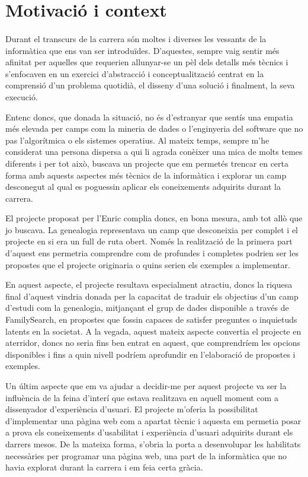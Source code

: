 \section{Motivació i context}

    \paragraph{}
    Durant el transcurs de la carrera són moltes i diverses les vessants de la informàtica que ens van ser introduïdes. D’aquestes, sempre vaig sentir més afinitat per aquelles que requerien allunyar-se un pèl dels detalls més tècnics i s'enfocaven en un exercici d’abstracció i conceptualització centrat en la comprensió d’un problema quotidià, el disseny d’una solució i finalment, la seva execució.

    Entenc doncs, que donada la situació, no és d'estranyar que sentís una empatia més elevada per camps com la mineria de dades o l’enginyeria del software que no pas l'algorítmica o els sistemes operatius. Al mateix temps, sempre m’he considerat una persona dispersa a qui li agrada conèixer una mica de molts temes diferents i per tot això, buscava un projecte que em permetés trencar en certa forma amb aquests aspectes més tècnics de la informàtica i explorar un camp desconegut al qual es poguessin aplicar els coneixements adquirits durant la carrera.

    El projecte proposat per l’Enric complia doncs, en bona mesura, amb tot allò que jo buscava. La genealogia representava un camp que desconeixia per complet i el projecte en si era un full de ruta obert. Només la realització de la primera part d'aquest ens permetria comprendre com de profundes i completes podrien ser les propostes que el projecte originaria o quins serien els exemples a implementar.

    En aquest aspecte, el projecte resultava especialment atractiu, doncs la riquesa final d'aquest vindria donada per la capacitat de traduir els objectius d’un camp d’estudi com la genealogia, mitjançant el grup de dades disponible a través de FamilySearch, en propostes que fossin capaces de satisfer preguntes o inquietuds latents en la societat. A la vegada, aquest mateix aspecte convertia el projecte en aterridor, doncs no seria fins ben entrat en aquest, que comprendríem les opcions disponibles i fins a quin nivell podríem aprofundir en l'elaboració de propostes i exemples.

    Un últim aspecte que em va ajudar a decidir-me per aquest projecte va ser la influència de la feina d'interí que estava realitzava en aquell moment com a dissenyador d’experiència d’usuari. El projecte m’oferia la possibilitat d’implementar una pàgina web com a apartat tècnic i aquesta em permetia posar a prova els coneixements d’usabilitat i experiència d’usuari adquirits durant els darrers mesos. De la mateixa forma, s'obria la porta a desenvolupar les habilitats necessàries per programar una pàgina web, una part de la informàtica que no havia explorat durant la carrera i em feia certa gràcia.
